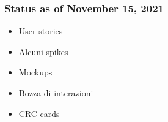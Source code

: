 \documentclass[11pt]{beamer}
\begin{document}
\begin{frame}
	\end{frame}

	\begin{frame}
		\frametitle{Status as of November 15, 2021}
		
		\begin{itemize}
			\item User stories
			\item Alcuni spikes
			\item Mockups
			\item Bozza di interazioni
			\item CRC cards
		\end{itemize}
	\end{frame}
\end{document}
